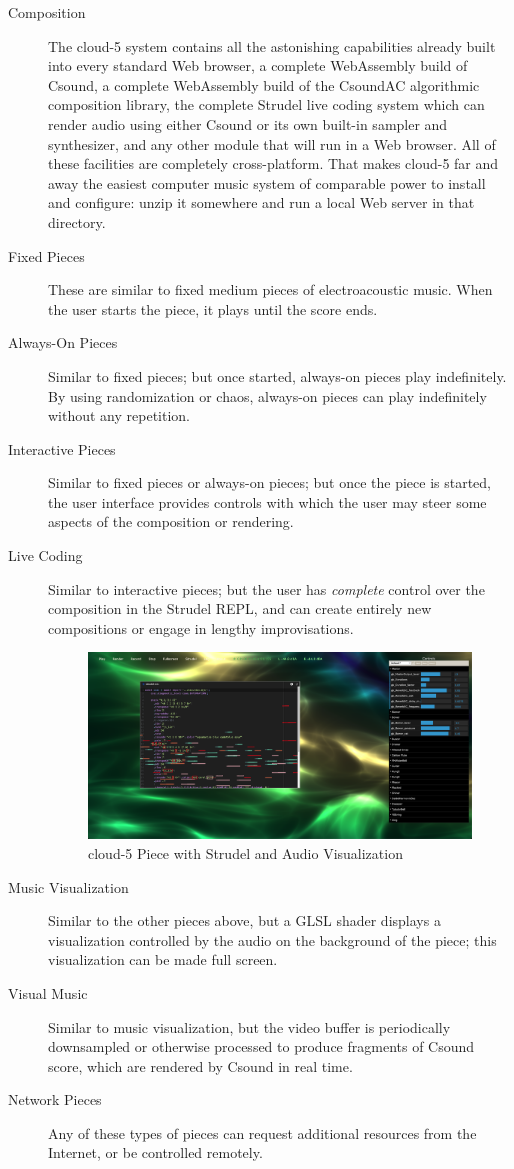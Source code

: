 \documentclass[runningheads,a4paper]{llncs}
\begin{document}
\begin{description}
\item[Composition] The cloud-5 system contains all the astonishing capabilities already built into every standard Web browser, a complete WebAssembly build of Csound, a complete WebAssembly build of the CsoundAC algorithmic composition library, the complete Strudel live coding system which can render audio using either Csound or its own built-in sampler and synthesizer, and any other module that will run in a Web browser. All of these facilities are completely cross-platform. That makes cloud-5 far and away the easiest computer music system of comparable power to install and configure: unzip it somewhere and run a local Web server in that directory. 
\item[Fixed Pieces] These are similar to fixed medium pieces of electroacoustic music. When the user starts the piece, it plays until the score ends. 
\item[Always-On Pieces] Similar to fixed pieces; but once started, always-on pieces play indefinitely. By using randomization or chaos, always-on pieces can play indefinitely without any repetition.
\item[Interactive Pieces] Similar to fixed pieces or always-on pieces; but once the piece is started, the user interface provides controls with which the user may steer some aspects of the composition or rendering.
\item[Live Coding] Similar to interactive pieces; but the user has \emph{complete} control over the composition in the Strudel REPL, and can create entirely new compositions or engage in lengthy improvisations.

\begin{figure}
\centering
\includegraphics[width=0.90\linewidth]{cloud5}
\caption{cloud-5 Piece with Strudel and Audio Visualization}
\label{fig:cloud5}
\end{figure}

\item[Music Visualization] Similar to the other pieces above, but a GLSL shader displays a visualization controlled by the audio on the background of the piece; this visualization can be made full screen.
\item[Visual Music] Similar to music visualization, but the video buffer is periodically downsampled or otherwise processed to produce fragments of Csound score, which are rendered by Csound in real time.
\item[Network Pieces] Any of these types of pieces can request additional resources from the Internet, or be controlled remotely.
\end{description}
\end{document}
